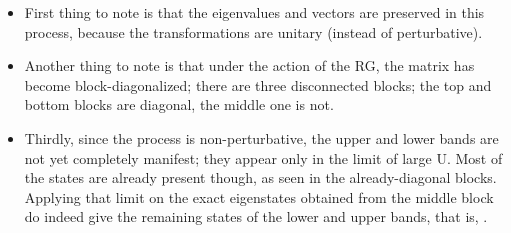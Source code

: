 \documentclass[12pt]{article}
\begin{document}
\begin{itemize}
\item First thing to note is that the eigenvalues and vectors are preserved in this process, because the transformations are unitary (instead of perturbative). 
\item Another thing to note is that under the action of the RG, the matrix has become block-diagonalized; there are three  disconnected blocks; the top and bottom blocks are diagonal, the middle one is not. \item Thirdly, since the process is non-perturbative, the upper and lower bands are not yet completely manifest; they appear only in the limit of large U. Most of the states are already present though, as seen in the already-diagonal blocks. Applying that limit on the exact eigenstates obtained from the middle block do indeed give the remaining states of the lower and upper bands, that is, .
\end{itemize}
\end{document}
